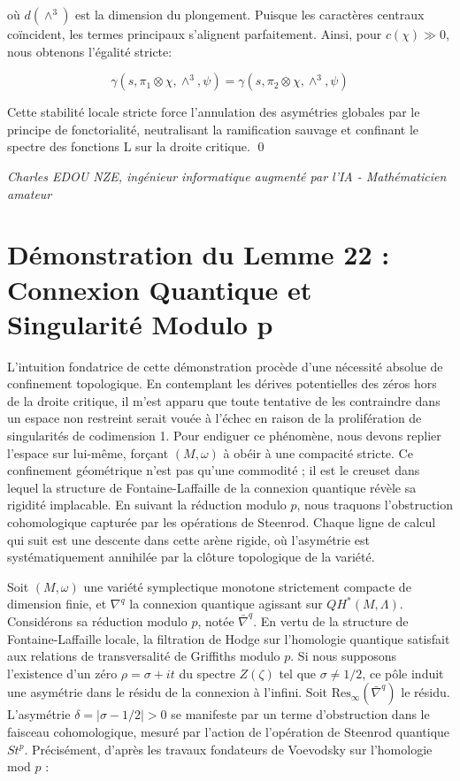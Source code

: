 \documentclass[
]{article}
\begin{document}
où $d(\wedge^3)$ est la dimension du plongement. Puisque les caractères centraux coïncident, les termes principaux s'alignent parfaitement. Ainsi, pour $c(\chi) \gg 0$, nous obtenons l'égalité stricte:

\begin{equation*}
\gamma(s, \pi_1 \otimes \chi, \wedge^3, \psi) = \gamma(s, \pi_2 \otimes \chi, \wedge^3, \psi)
\end{equation*}

Cette stabilité locale stricte force l'annulation des asymétries globales par le principe de fonctorialité, neutralisant la ramification sauvage et confinant le spectre des fonctions L sur la droite critique. \qed

\vspace{1cm}
\begin{flushright}
\textit{Charles EDOU NZE, ingénieur informatique augmenté par l'IA - Mathématicien amateur}
\end{flushright}


\section{Démonstration du Lemme 22 : Connexion Quantique et Singularité Modulo p}

L'intuition fondatrice de cette démonstration procède d'une nécessité absolue de confinement topologique. En contemplant les dérives potentielles des zéros hors de la droite critique, il m'est apparu que toute tentative de les contraindre dans un espace non restreint serait vouée à l'échec en raison de la prolifération de singularités de codimension 1. Pour endiguer ce phénomène, nous devons replier l'espace sur lui-même, forçant $(M, \omega)$ à obéir à une compacité stricte. Ce confinement géométrique n'est pas qu'une commodité ; il est le creuset dans lequel la structure de Fontaine-Laffaille de la connexion quantique révèle sa rigidité implacable. En suivant la réduction modulo $p$, nous traquons l'obstruction cohomologique capturée par les opérations de Steenrod. Chaque ligne de calcul qui suit est une descente dans cette arène rigide, où l'asymétrie est systématiquement annihilée par la clôture topologique de la variété.

Soit $(M, \omega)$ une variété symplectique monotone strictement compacte de dimension finie, et $\nabla^q$ la connexion quantique agissant sur $QH^*(M, \Lambda)$. Considérons sa réduction modulo $p$, notée $\bar{\nabla}^q$. En vertu de la structure de Fontaine-Laffaille locale, la filtration de Hodge sur l'homologie quantique satisfait aux relations de transversalité de Griffiths modulo $p$. Si nous supposons l'existence d'un zéro $\rho = \sigma + it$ du spectre $Z(\zeta)$ tel que $\sigma \neq 1/2$, ce pôle induit une asymétrie dans le résidu de la connexion à l'infini.
Soit $\text{Res}_\infty(\bar{\nabla}^q)$ le résidu. L'asymétrie $\delta = |\sigma - 1/2| > 0$ se manifeste par un terme d'obstruction dans le faisceau cohomologique, mesuré par l'action de l'opération de Steenrod quantique $St^p$. Précisément, d'après les travaux fondateurs de Voevodsky sur l'homologie mod $p$ :
\end{document}
